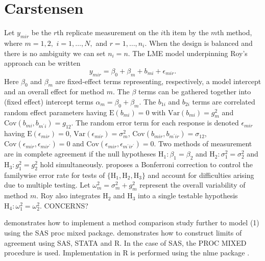 \documentclass[12pt, a4paper]{report}
\theoremstyle{plain}
\theoremstyle{definition}
\theoremstyle{remark}
\begin{document}
\newpage





\section{Carstensen}
Let $y_{mir} $ be the $r$th replicate measurement on the $i$th item by the $m$th method, where $m=1,2,$ $i=1,\ldots,N,$ and $r = 1,\ldots,n_i.$ When the design is balanced and there is no ambiguity we can set $n_i=n.$ The LME model underpinning Roy's approach can be written
\begin{equation}
y_{mir} = \beta_{0} + \beta_{m} + b_{mi} + \epsilon_{mir}.
\end{equation}
Here $\beta_0$ and $\beta_m$ are fixed-effect terms representing, respectively, a model intercept and an overall effect for method $m.$
The $\beta$ terms can be gathered together into (fixed effect) intercept terms $\alpha_m=\beta_0+\beta_m.$ The $b_{1i}$ and $b_{2i}$ terms are correlated random effect parameters having $\mathrm{E}(b_{mi})=0$ with $\mathrm{Var}(b_{mi})=g^2_m$ and $\mathrm{Cov}(b_{mi}, b_{m^\prime i})=g_{12}.$ The random error term for each response is denoted $\epsilon_{mir}$ having $\mathrm{E}(\epsilon_{mir})=0$, $\mathrm{Var}(\epsilon_{mir})=\sigma^2_m$, $\mathrm{Cov}(b_{mir}, b_{m^\prime ir})=\sigma_{12}$, $\mathrm{Cov}(\epsilon_{mir}, \epsilon_{mir^\prime})= 0$ and $\mathrm{Cov}(\epsilon_{mir}, \epsilon_{m^\prime ir^\prime})= 0.$ Two methods of measurement are in complete agreement if the null hypotheses $\mathrm{H}_1\colon \beta_1 = \beta_2$ and $\mathrm{H}_2\colon \sigma^2_1 = \sigma^2_2 $ and $\mathrm{H}_3\colon g^2_1= g^2_2$ hold simultaneously. \citet{roy} proposes a Bonferroni correction to control the familywise error rate for tests of $\{\mathrm{H}_1, \mathrm{H}_2, \mathrm{H}_3\}$ and account for difficulties arising due to multiple testing. Let $\omega^2_m = \sigma^2_m + g^2_m$ represent the overall variability of method $m.$  Roy also integrates $\mathrm{H}_2$ and $\mathrm{H}_3$ into a single testable hypothesis $\mathrm{H}_4\colon \omega^2_1=\omega^2_2.$ CONCERNS?

\bigskip

\citet{Roy} demonstrates how to implement a method comparison study further to model (1) using the SAS proc mixed package.
\citet{BXC2008} demonstrates how to construct limits of agreement using SAS, STATA and R. In the case of SAS, the PROC MIXED procedure is used.
Implementation in R is performed using the nlme package \citep{pb2000}.
\end{document}
